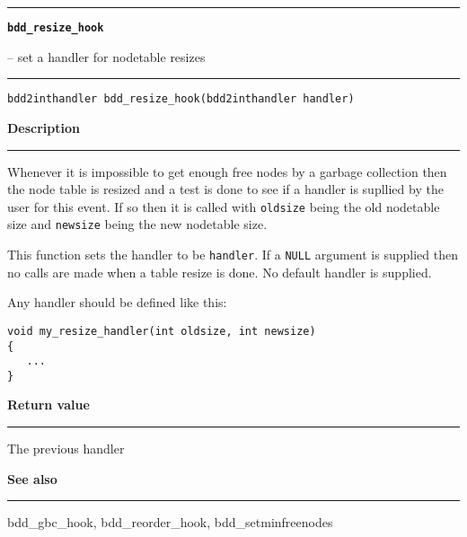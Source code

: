 \begin{minipage}{\textwidth}

\noindent\begin{minipage}{\textwidth}
\rule{\textwidth}{0.5mm}
{\tt\bf bdd\_resize\_hook  }
\--- set a handler for nodetable resizes  \hspace{\fill}
\\\rule[1.5ex]{\textwidth}{0.5mm}
\end{minipage}

\noindent\begin{verbatim}
bdd2inthandler bdd_resize_hook(bdd2inthandler handler) 
\end{verbatim}

\vspace{\parsep}\noindent
{\bf Description}\\\rule[1.5ex]{\textwidth}{0.2mm}\vspace{-1.5ex}\setlength{\parindent}{1em}
Whenever it is impossible to get enough free nodes by a garbage
         collection then the node table is resized and a test is done to see
	 if a handler is supllied by the user for this event. If so then
	 it is called with {\tt oldsize} being the old nodetable size and
	 {\tt newsize} being the new nodetable size.

	 This function sets the handler to be {\tt handler}. If a {\tt NULL}
	 argument is supplied then no calls are made when a table resize
	 is done. No default handler is supplied.

	 Any handler should be defined like this:
	 \begin{verbatim}
void my_resize_handler(int oldsize, int newsize)
{
   ...
}
\end{verbatim} 

\setlength{\parindent}{0em}\vspace{\parsep}\vspace{\baselineskip}\noindent
{\bf Return value}\\\rule[1.5ex]{\textwidth}{0.2mm}\vspace{-1.5ex}
The previous handler 

\vspace{\parsep}\vspace{\baselineskip}\noindent
{\bf See also}\\\rule[1.5ex]{\textwidth}{0.2mm}\vspace{-1.5ex}
bdd\_gbc\_hook, bdd\_reorder\_hook, bdd\_setminfreenodes  
\end{minipage}
